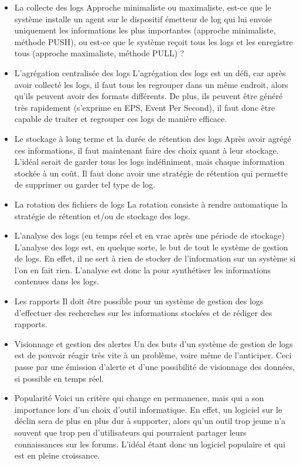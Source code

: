 \documentclass[paper=a4, fontsize=11pt]{scrartcl}
\begin{document}
\begin{itemize}\itemsep0pt \parskip0pt 
\item La collecte des logs
\subitem Approche minimaliste ou maximaliste, est-ce que le système installe un agent sur le dispositif émetteur de log qui lui envoie uniquement les informations les plus importantes (approche minimaliste, méthode PUSH), ou est-ce que le système reçoit tous les logs et les enregistre tous (approche maximaliste, méthode PULL) ?\\
\item L'agrégation centralisée des logs
\subitem L'agrégation des logs est un défi, car après avoir collecté les logs, il faut tous les regrouper dans un même endroit, alors qu'ils peuvent avoir des formats différents. De plus, ils peuvent être généré très rapidement (s'exprime en EPS, Event Per Second), il faut donc être capable de traiter et regrouper ces logs de manière efficace.\\
\item Le stockage à long terme et la durée de rétention des logs
\subitem Après avoir agrégé ces informations, il faut maintenant faire des choix quant à leur stockage. L'idéal serait de garder tous les logs indéfiniment, mais chaque information stockée à un coût. Il faut donc avoir une stratégie de rétention qui permette de supprimer ou garder tel type de log.\\
\item La rotation des fichiers de logs
\subitem La rotation consiste à rendre automatique la stratégie de rétention et/ou de stockage des logs.\\
\item L'analyse des logs (en temps réel et en vrac après une période de stockage)
\subitem L'analyse des logs est, en quelque sorte, le but de tout le système de gestion de logs. En effet, il ne sert à rien de stocker de l'information sur un système si l'on en fait rien. L'analyse est donc la pour synthétiser les informations contenues dans les logs.\\
\item Les rapports
\subitem Il doit être possible pour un système de gestion des logs d'effectuer des recherches sur les informations stockées et de rédiger des rapports.\\
\item Visionnage et gestion des alertes
\subitem Un des buts d'un système de gestion de logs est de pouvoir réagir très vite à un problème, voire même de l'anticiper. Ceci passe par une émission d'alerte et d'une possibilité de visionnage des données, si possible en temps réel.\\
\item Popularité
\subitem Voici un critère qui change en permanence, mais qui a son importance lors d'un choix d'outil informatique. En effet, un logiciel sur le déclin sera de plus en plus dur à supporter, alors qu'un outil trop jeune n'a souvent que trop peu d'utilisateurs qui pourraient partager leurs connaissances sur les forums. L'idéal étant donc un logiciel populaire et qui est en pleine croissance.
\end{itemize}
\end{document}
